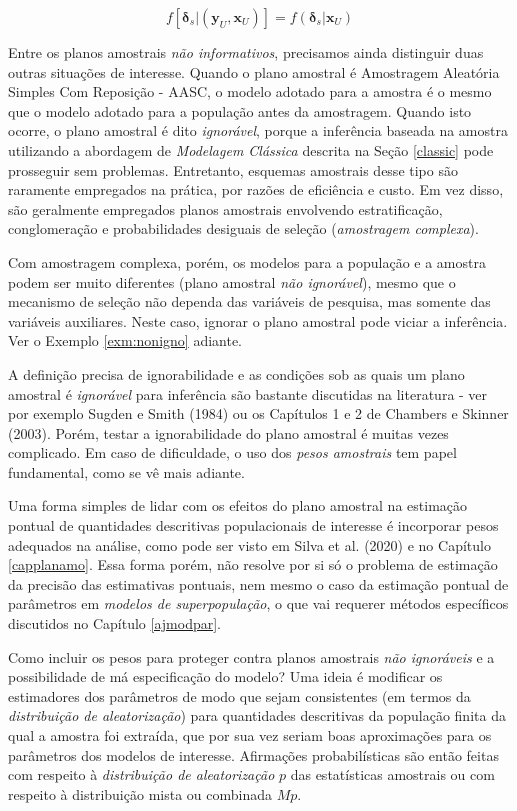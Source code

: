 \documentclass[
  12pt,
  brazilian,
]{book}
\theoremstyle{definition}
\theoremstyle{definition}
\theoremstyle{definition}
\theoremstyle{definition}
\theoremstyle{remark}
\begin{document}
\begin{equation}
f\left[ \mathbf{\delta }_s | \left( \mathbf{y}_U , \mathbf{x}_U \right)
\right] = f\left( \mathbf{\delta }_s | \mathbf{x}_U \right) \label{eq:ref8}
\end{equation}

Entre os planos amostrais \emph{não informativos}, precisamos ainda distinguir duas
outras situações de interesse. Quando o plano amostral é Amostragem Aleatória
Simples Com Reposição - AASC, o modelo adotado para a amostra é o mesmo que o
modelo adotado para a população antes da amostragem. Quando isto ocorre, o plano
amostral é dito \emph{ignorável}, porque a inferência baseada na amostra utilizando a
abordagem de \emph{Modelagem Clássica} descrita na Seção \ref{classic} pode prosseguir sem
problemas. Entretanto, esquemas amostrais desse tipo são raramente empregados na
prática, por razões de eficiência e custo. Em vez disso, são geralmente
empregados planos amostrais envolvendo estratificação, conglomeração e
probabilidades desiguais de seleção (\emph{amostragem complexa}).

Com amostragem complexa, porém, os modelos para a população e a amostra podem
ser muito diferentes (plano amostral \emph{não ignorável}), mesmo que o mecanismo de
seleção não dependa das variáveis de pesquisa, mas somente das variáveis
auxiliares. Neste caso, ignorar o plano amostral pode viciar a inferência. Ver
o Exemplo \ref{exm:nonigno} adiante.

A definição precisa de ignorabilidade e as condições sob as quais um plano
amostral é \emph{ignorável} para inferência são bastante discutidas na literatura -
ver por exemplo Sugden e Smith (1984) ou os Capítulos 1 e 2 de Chambers e Skinner (2003). Porém, testar
a ignorabilidade do plano amostral é muitas vezes complicado. Em caso de
dificuldade, o uso dos \emph{pesos amostrais} tem papel fundamental, como se vê
mais adiante.

Uma forma simples de lidar com os efeitos do plano amostral na estimação pontual
de quantidades descritivas populacionais de interesse é incorporar pesos
adequados na análise, como pode ser visto em Silva et al. (2020) e no Capítulo \ref{capplanamo}.
Essa forma porém, não resolve por si só o problema de estimação da precisão das
estimativas pontuais, nem mesmo o caso da estimação pontual de parâmetros em
\emph{modelos de superpopulação}, o que vai requerer métodos específicos discutidos no Capítulo \ref{ajmodpar}.

Como incluir os pesos para proteger contra planos amostrais \emph{não ignoráveis} e a
possibilidade de má especificação do modelo? Uma ideia é modificar os estimadores
dos parâmetros de modo que sejam consistentes (em termos da \emph{distribuição de aleatorização})
para quantidades descritivas da população finita da qual a amostra foi extraída, que
por sua vez seriam boas aproximações para os parâmetros dos modelos de interesse. Afirmações
probabilísticas são então feitas com respeito à \emph{distribuição de aleatorização} \(p\) das
estatísticas amostrais ou com respeito à distribuição mista ou combinada \(Mp\).
\end{document}
